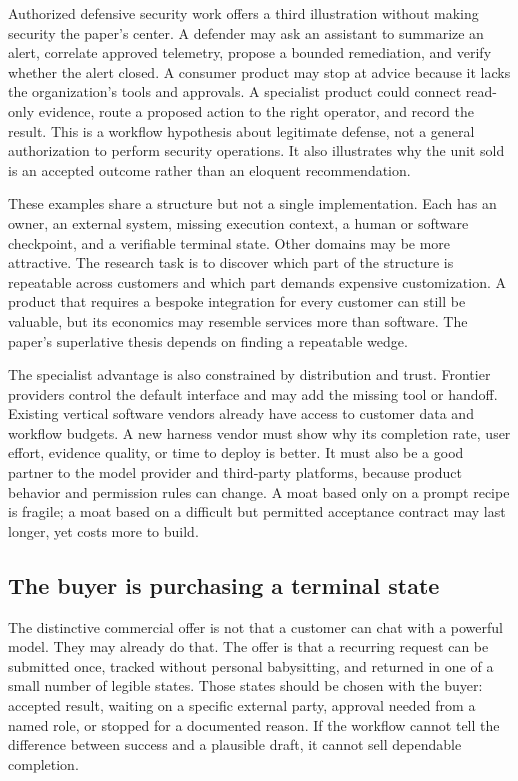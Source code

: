 Authorized defensive security work offers a third illustration without making security the paper's center. A defender may ask an assistant to summarize an alert, correlate approved telemetry, propose a bounded remediation, and verify whether the alert closed. A consumer product may stop at advice because it lacks the organization’s tools and approvals. A specialist product could connect read-only evidence, route a proposed action to the right operator, and record the result. This is a workflow hypothesis about legitimate defense, not a general authorization to perform security operations. It also illustrates why the unit sold is an accepted outcome rather than an eloquent recommendation.

These examples share a structure but not a single implementation. Each has an owner, an external system, missing execution context, a human or software checkpoint, and a verifiable terminal state. Other domains may be more attractive. The research task is to discover which part of the structure is repeatable across customers and which part demands expensive customization. A product that requires a bespoke integration for every customer can still be valuable, but its economics may resemble services more than software. The paper's superlative thesis depends on finding a repeatable wedge.

The specialist advantage is also constrained by distribution and trust. Frontier providers control the default interface and may add the missing tool or handoff. Existing vertical software vendors already have access to customer data and workflow budgets. A new harness vendor must show why its completion rate, user effort, evidence quality, or time to deploy is better. It must also be a good partner to the model provider and third-party platforms, because product behavior and permission rules can change. A moat based only on a prompt recipe is fragile; a moat based on a difficult but permitted acceptance contract may last longer, yet costs more to build.

\subsection*{The buyer is purchasing a terminal state}

The distinctive commercial offer is not that a customer can chat with a powerful model. They may already do that. The offer is that a recurring request can be submitted once, tracked without personal babysitting, and returned in one of a small number of legible states. Those states should be chosen with the buyer: accepted result, waiting on a specific external party, approval needed from a named role, or stopped for a documented reason. If the workflow cannot tell the difference between success and a plausible draft, it cannot sell dependable completion.

